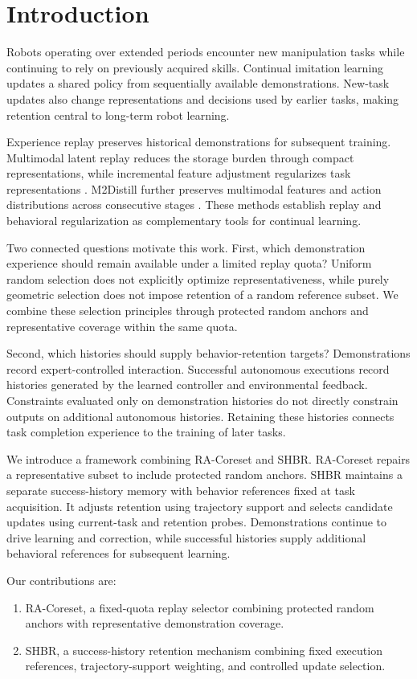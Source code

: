 \section{Introduction}
Robots operating over extended periods encounter new manipulation tasks
while continuing to rely on previously acquired skills. Continual imitation
learning updates a shared policy from sequentially available demonstrations.
New-task updates also change representations and decisions used by
earlier tasks, making retention central to long-term robot learning.

Experience replay preserves historical demonstrations for subsequent
training. Multimodal latent replay reduces the storage burden through
compact representations, while incremental feature adjustment regularizes
task representations \citep{yu2026mlr}. M2Distill further preserves
multimodal features and action distributions across consecutive stages
\citep{roy2025m2distill}. These methods establish replay and behavioral
regularization as complementary tools for continual learning.

Two connected questions motivate this work. First, which demonstration
experience should remain available under a limited replay quota?
Uniform random selection does not explicitly optimize representativeness,
while purely geometric selection does not impose retention of a random
reference subset. We combine these selection principles through protected
random anchors and representative coverage within the same quota.

Second, which histories should supply behavior-retention targets?
Demonstrations record expert-controlled interaction. Successful autonomous
executions record histories generated by the learned controller and
environmental feedback. Constraints evaluated only on demonstration
histories do not directly constrain outputs on additional autonomous
histories. Retaining these histories connects task completion experience
to the training of later tasks.

We introduce a framework combining RA-Coreset and SHBR. RA-Coreset repairs
a representative subset to include protected random anchors. SHBR maintains
a separate success-history memory with behavior references fixed at task
acquisition. It adjusts retention using trajectory support and selects
candidate updates using current-task and retention probes. Demonstrations
continue to drive learning and correction, while successful histories supply
additional behavioral references for subsequent learning.

Our contributions are:
\begin{enumerate}
\item RA-Coreset, a fixed-quota replay selector combining protected random
anchors with representative demonstration coverage.
\item SHBR, a success-history retention mechanism combining fixed execution
references, trajectory-support weighting, and controlled update selection.
\end{enumerate}
